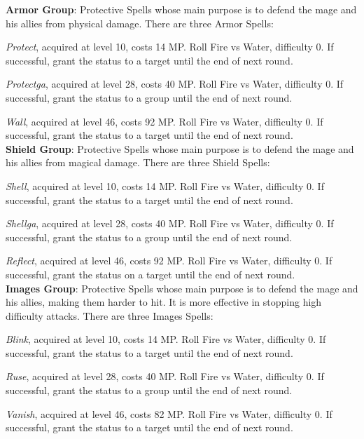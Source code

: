 \begin{multicols}{2}
    \textbf{Armor Group}: Protective Spells whose main purpose is to defend the mage and his allies from physical damage. There are three Armor Spells:

    \textit{Protect}, acquired at level 10, costs 14 MP\@. Roll Fire vs Water, difficulty 0. If successful, grant the  status to a target until the end of next round.

    \textit{Protectga}, acquired at level 28, costs 40 MP\@. Roll Fire vs Water, difficulty 0. If successful, grant the  status to a group until the end of next round.

    \textit{Wall}, acquired at level 46, costs 92 MP\@. Roll Fire vs Water, difficulty 0. If successful, grant the  status to a target until the end of next round.\\%

    \textbf{Shield Group}: Protective Spells whose main purpose is to defend the mage and his allies from magical damage. There are three Shield Spells:

    \textit{Shell}, acquired at level 10, costs 14 MP\@. Roll Fire vs Water, difficulty 0. If successful, grant the  status to a target until the end of next round.

    \textit{Shellga}, acquired at level 28, costs 40 MP\@. Roll Fire vs Water, difficulty 0. If successful, grant the  status to a group until the end of next round.

    \textit{Reflect}, acquired at level 46, costs 92 MP\@. Roll Fire vs Water, difficulty 0. If successful, grant the  status on a target until the end of next round.\\%

    \textbf{Images Group}: Protective Spells whose main purpose is to defend the mage and his allies, making them harder to hit. It is more effective in stopping high difficulty attacks. There are three Images Spells:

    \textit{Blink}, acquired at level 10, costs 14 MP\@. Roll Fire vs Water, difficulty 0. If successful, grant the  status to a target until the end of next round.

    \textit{Ruse}, acquired at level 28, costs 40 MP\@. Roll Fire vs Water, difficulty 0. If successful, grant the  status to a group until the end of next round.

    \textit{Vanish}, acquired at level 46, costs 82 MP\@. Roll Fire vs Water, difficulty 0. If successful, grant the  status to a target until the end of next round.


\end{multicols}

